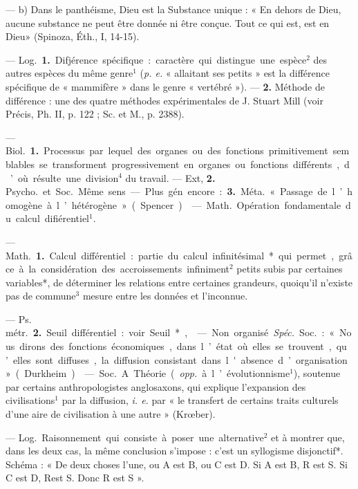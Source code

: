 \begin{itemize}[leftmargin=1cm, label=, itemsep=1pt]
— b) Dans le panthéisme, Dieu
est la Substance unique : « En dehors
de Dieu, aucune substance ne peut
être donnée ni être conçue. Tout ce
qui est, est en Dieu» (Spinoza, Éth.,
I, 14-15).

 — \si{Log.} {\bf 1.} Difjérence spécifique : caractère qui distingue une
espèce$^2$ des autres espèces du même
genre$^1$ ({\it p. e.} « allaitant ses petits » est
la différence spécifique de « mammifère » dans le genre « vertébré »).
— {\bf 2.} Méthode de différence : une
des quatre méthodes expérimentales
de J. Stuart Mill (voir Précis, Ph. II,
p. 122 ; Sc. et M., p. 2388).

 — \si{Biol.} {\bf 1.} Processus par lequel des organes ou des
fonctions primitivement semblables
se transforment progressivement en
organes ou fonctions différents, d’où
résulte une division$^4$ du travail. —
Ext, {\bf 2.} \si{Psycho.} et \si{Soc.} Même sens.
— Plus gén. encore : {\bf 3.} \si{Méta.} « Passage de l’homogène à l’hétérogène »
(Spencer).

 — \si{Math.} Opération
fondamentale du calcul difiérentiel$^1$.

 — \si{Math.} {\bf 1.} Calcul différentiel : partie du calcul infinitésimal* qui permet, grâce à la considération des accroissements infiniment$^2$ petits subis par certaines
variables*, de déterminer les relations entre certaines grandeurs,
quoiqu'il n'existe pas de commune$^3$
mesure entre les données et l’inconnue.

— \si{Ps. métr.} {\bf 2.} Seuil différentiel :
voir Seuil*,

 — Non organisé. {\it Spéc.} \si{Soc.} :
« Nous dirons des fonctions économiques, dans l’état où elles se trouvent, qu’elles sont diffuses, la diffusion consistant dans l'absence d’organisation » (Durkheim).

 — \si{Soc.} A. Théorie
({\it opp.} à l’évolutionnisme$^1$), soutenue
par certains anthropologistes anglosaxons, qui explique l'expansion
des civilisations$^1$ par la diffusion,
{\it i. e.} par « le transfert de certains
traits culturels d'une aire de civilisation à une autre » (Krœber).

 — \si{Log.} Raisonnement qui
consiste à poser une alternative$^2$ et
à montrer que, dans les deux cas,
la même conclusion s'impose : c’est
un syllogisme disjonctif*. Schéma :
« De deux choses l’une, ou A est B,
ou C est D. Si A est B, R est S. Si
C est D, Rest S. Donc R est S ».


\end{itemize}
